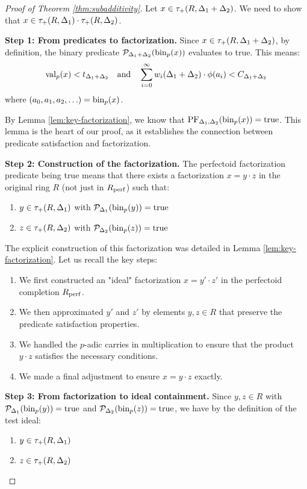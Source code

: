 \begin{proof}[Proof of Theorem \ref{thm:subadditivity}]
Let $x \in \tau_+(R,\Delta_1+\Delta_2)$. We need to show that $x \in \tau_+(R,\Delta_1) \cdot \tau_+(R,\Delta_2)$.

\textbf{Step 1: From predicates to factorization.}
Since $x \in \tau_+(R,\Delta_1+\Delta_2)$, by definition, the binary predicate $\mathcal{P}_{\Delta_1+\Delta_2}(\operatorname{bin}_p(x))$ evaluates to true. This means:
\begin{align*}
\operatorname{val}_p(x) < t_{\Delta_1+\Delta_2} \quad \text{and} \quad \sum_{i=0}^{\infty} w_i(\Delta_1+\Delta_2) \cdot \phi(a_i) < C_{\Delta_1+\Delta_2}
\end{align*}
where $(a_0, a_1, a_2, \ldots) = \operatorname{bin}_p(x)$.

By Lemma \ref{lem:key-factorization}, we know that $\text{PF}_{\Delta_1, \Delta_2}(\operatorname{bin}_p(x)) = \text{true}$. This lemma is the heart of our proof, as it establishes the connection between predicate satisfaction and factorization.

\textbf{Step 2: Construction of the factorization.}
The perfectoid factorization predicate being true means that there exists a factorization $x = y \cdot z$ in the original ring $R$ (not just in $R_{\operatorname{perf}}$) such that:
\begin{enumerate}
    \item $y \in \tau_+(R,\Delta_1)$ with $\mathcal{P}_{\Delta_1}(\operatorname{bin}_p(y)) = \text{true}$
    \item $z \in \tau_+(R,\Delta_2)$ with $\mathcal{P}_{\Delta_2}(\operatorname{bin}_p(z)) = \text{true}$
\end{enumerate}

The explicit construction of this factorization was detailed in Lemma \ref{lem:key-factorization}. Let us recall the key steps:
\begin{enumerate}
    \item We first constructed an "ideal" factorization $x = y' \cdot z'$ in the perfectoid completion $R_{\operatorname{perf}}$.
    \item We then approximated $y'$ and $z'$ by elements $y, z \in R$ that preserve the predicate satisfaction properties.
    \item We handled the $p$-adic carries in multiplication to ensure that the product $y \cdot z$ satisfies the necessary conditions.
    \item We made a final adjustment to ensure $x = y \cdot z$ exactly.
\end{enumerate}

\textbf{Step 3: From factorization to ideal containment.}
Since $y, z \in R$ with $\mathcal{P}_{\Delta_1}(\operatorname{bin}_p(y)) = \text{true}$ and $\mathcal{P}_{\Delta_2}(\operatorname{bin}_p(z)) = \text{true}$, we have by the definition of the test ideal:
\begin{enumerate}
    \item $y \in \tau_+(R,\Delta_1)$
    \item $z \in \tau_+(R,\Delta_2)$
\end{enumerate}


\end{proof}
